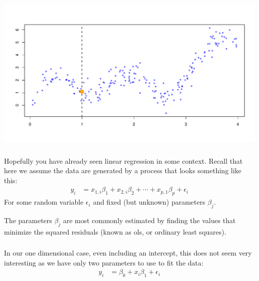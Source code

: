 \documentclass[xetex,mathserif,serif,aspectratio=169]{beamer}
\begin{document}
\begin{frame}[fragile] \frametitle{} \oldB \small

\begin{center}
\includegraphics[width=\textwidth]{img/ksmooth3.pdf}
\end{center}

\end{frame}

\begin{frame}[fragile] \frametitle{} \oldB \small


Hopefully you have already seen linear regression in
some context. Recall that here we assume the data are
generated by a process that looks something like this:
\begin{align*}
y_i &= x_{1,i} \beta_1 + x_{2,i} \beta_2 + \cdots + x_{p,1} \beta_p + \epsilon_i
\end{align*}
For some random variable $\epsilon_i$ and fixed (but unknown)
parameters $\beta_j$.

The parameters $\beta_j$ are most commonly estimated by finding
the values that minimize the squared residuals (known as ols, or ordinary
least squares).

\end{frame}

\begin{frame}[fragile] \frametitle{} \oldB \small


In our one dimensional case, even including an intercept, this does
not seem very interesting as we have only two parameters to use to
fit the data:
\begin{align*}
y_i &= \beta_0 + x_i \beta_1 + \epsilon_i
\end{align*}

\end{frame}
\end{document}
